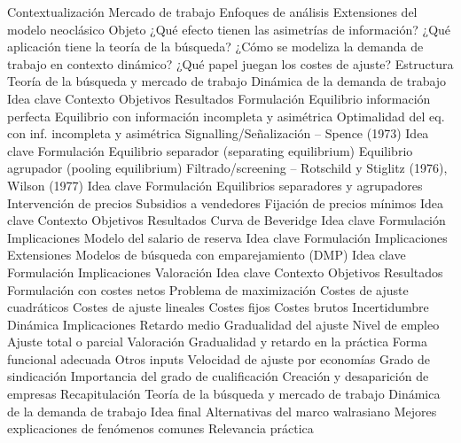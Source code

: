 \documentclass{nuevotema}
\begin{document}
\begin{esquema}[enumerate]
	\1[] 
		\2 Contextualización
			\3 Mercado de trabajo
			\3 Enfoques de análisis
			\3 Extensiones del modelo neoclásico
		\2 Objeto
			\3 ¿Qué efecto tienen las asimetrías de información?
			\3 ¿Qué aplicación tiene la teoría de la búsqueda?
			\3 ¿Cómo se modeliza la demanda de trabajo en contexto dinámico?
			\3 ¿Qué papel juegan los costes de ajuste?
		\2 Estructura
			\3 Teoría de la búsqueda y mercado de trabajo
			\3 Dinámica de la demanda de trabajo
	\1 
		\2 Idea clave
			\3 Contexto
			\3 Objetivos
			\3 Resultados
		\2 Formulación
			\3 Equilibrio información perfecta
			\3 Equilibrio con información incompleta y asimétrica
			\3 Optimalidad del eq. con inf. incompleta y asimétrica
		\2 Signalling/Señalización -- Spence (1973)
			\3 Idea clave
			\3 Formulación
			\3 Equilibrio separador (separating equilibrium)
			\3 Equilibrio agrupador (pooling equilibrium)
		\2 Filtrado/screening -- Rotschild y Stiglitz (1976), Wilson (1977)
			\3 Idea clave
			\3 Formulación
			\3 Equilibrios separadores y agrupadores
		\2 Intervención de precios
			\3 Subsidios a vendedores
			\3 Fijación de precios mínimos
	\1 
		\2 Idea clave
			\3 Contexto
			\3 Objetivos
			\3 Resultados
		\2 Curva de Beveridge
			\3 Idea clave
			\3 Formulación
			\3 Implicaciones
		\2 Modelo del salario de reserva
			\3 Idea clave
			\3 Formulación
			\3 Implicaciones
			\3 Extensiones
		\2 Modelos de búsqueda con emparejamiento (DMP)
			\3 Idea clave
			\3 Formulación
			\3 Implicaciones
			\3 Valoración
	\1 
		\2 Idea clave
			\3 Contexto
			\3 Objetivos
			\3 Resultados
		\2 Formulación con costes netos
			\3 Problema de maximización
			\3 Costes de ajuste cuadráticos
			\3 Costes de ajuste lineales
			\3 Costes fijos
			\3 Costes brutos
			\3 Incertidumbre
			\3 Dinámica
		\2 Implicaciones
			\3 Retardo medio
			\3 Gradualidad del ajuste
			\3 Nivel de empleo
			\3 Ajuste total o parcial
		\2 Valoración
			\3 Gradualidad y retardo en la práctica
			\3 Forma funcional adecuada
			\3 Otros inputs
			\3 Velocidad de ajuste por economías
			\3 Grado de sindicación
			\3 Importancia del grado de cualificación
			\3 Creación y desaparición de empresas
	\1[] 
		\2 Recapitulación
			\3 Teoría de la búsqueda y mercado de trabajo
			\3 Dinámica de la demanda de trabajo
		\2 Idea final
			\3 Alternativas del marco walrasiano
			\3 Mejores explicaciones de fenómenos comunes
			\3 Relevancia práctica

\end{esquema}
\end{document}
